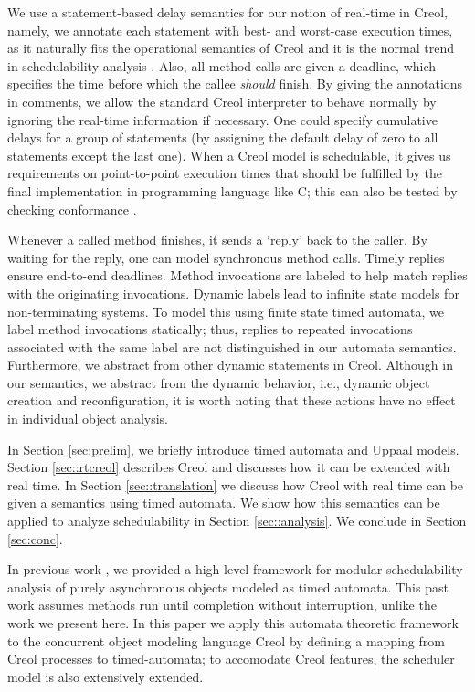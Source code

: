 \documentclass[copyright,creativecommons]{eptcs}
\theoremstyle{definition}
\renewcommand{\paragraph}[1]{\medskip \noindent {\bf #1}}
\newcommand{\Uppaal}{{\sc Uppaal}\xspace}
\begin{document}
We use a statement-based delay semantics for our notion of real-time in Creol, namely, we annotate each statement with best- and worst-case execution times, as it naturally fits the operational semantics of Creol and it is the normal trend in schedulability analysis \cite{EDF08,ClossePPSVWY01,FersmanYi07acc,KloukinasY03}.
Also, all method calls are given a deadline, which specifies the time before which the callee {\it should} finish.
By giving the annotations in comments, we allow the standard Creol interpreter to behave normally by ignoring the real-time information if necessary.
One could specify cumulative delays for a group of statements (by assigning the default delay of zero to all statements except the last one).
When a Creol model is schedulable, it gives us requirements on point-to-point execution times that should be fulfilled by the final implementation in programming language like C; this can also be tested by checking conformance \cite{AichernigGJSS08}. 

Whenever a called method finishes, it sends a `reply' back to the caller. By waiting for the reply, one can model synchronous method calls. Timely replies ensure end-to-end deadlines. Method invocations are labeled to help match replies with the originating invocations.
Dynamic labels lead to infinite state models for non-terminating systems. To model this using finite state timed automata, we label method invocations statically;
thus, replies to repeated invocations associated with the same label are not distinguished in our automata semantics.
Furthermore, we abstract from other dynamic statements in Creol.
Although in our semantics, we abstract from the dynamic behavior, i.e., dynamic object creation and reconfiguration, it is worth noting that these actions have no effect in individual object analysis.




In Section \ref{sec:prelim}, we briefly introduce timed automata and \Uppaal models.
Section \ref{sec::rtcreol} describes Creol and discusses how it can be extended with real time.
In Section \ref{sec::translation} we discuss how Creol with real time can be given a semantics using timed automata.
We show how this semantics can be applied to analyze schedulability in Section \ref{sec::analysis}.
We conclude in Section \ref{sec:conc}.




\paragraph{\bf Related Work}
In previous work \cite{Jaghoori09jlap,JaghouriDBC08RTSS}, we provided a high-level framework for modular schedulability analysis of purely asynchronous objects modeled as timed automata. This past work assumes methods run until completion without interruption, unlike the work we present here. In this paper we apply this automata theoretic framework to the concurrent object modeling language Creol \cite{johnsen07sosym} by defining a mapping from Creol processes to timed-automata; to accomodate Creol features, the scheduler model is also extensively extended.
\end{document}
